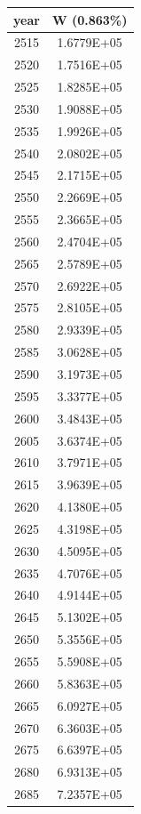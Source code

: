 \documentclass[a4paper]{article}
\begin{document}
	\begin{tabular}{|c|c|}
		\hline
		year & W (0.863\%) \\
		\hline
		2515 & 1.6779E+05 \\
		\hline
		2520 & 1.7516E+05 \\
		\hline
		2525 & 1.8285E+05 \\
		\hline
		2530 & 1.9088E+05 \\
		\hline
		2535 & 1.9926E+05 \\
		\hline
		2540 & 2.0802E+05 \\
		\hline
		2545 & 2.1715E+05 \\
		\hline
		2550 & 2.2669E+05 \\
		\hline
		2555 & 2.3665E+05 \\
		\hline
		2560 & 2.4704E+05 \\
		\hline
		2565 & 2.5789E+05 \\
		\hline
		2570 & 2.6922E+05 \\
		\hline
		2575 & 2.8105E+05 \\
		\hline
		2580 & 2.9339E+05 \\
		\hline
		2585 & 3.0628E+05 \\
		\hline
		2590 & 3.1973E+05 \\
		\hline
		2595 & 3.3377E+05 \\
		\hline
		2600 & 3.4843E+05 \\
		\hline
		2605 & 3.6374E+05 \\
		\hline
		2610 & 3.7971E+05 \\
		\hline
		2615 & 3.9639E+05 \\
		\hline
		2620 & 4.1380E+05 \\
		\hline
		2625 & 4.3198E+05 \\
		\hline
		2630 & 4.5095E+05 \\
		\hline
		2635 & 4.7076E+05 \\
		\hline
		2640 & 4.9144E+05 \\
		\hline
		2645 & 5.1302E+05 \\
		\hline
		2650 & 5.3556E+05 \\
		\hline
		2655 & 5.5908E+05 \\
		\hline
		2660 & 5.8363E+05 \\
		\hline
		2665 & 6.0927E+05 \\
		\hline
		2670 & 6.3603E+05 \\
		\hline
		2675 & 6.6397E+05 \\
		\hline
		2680 & 6.9313E+05 \\
		\hline
		2685 & 7.2357E+05 \\

\end{tabular}
\end{document}
